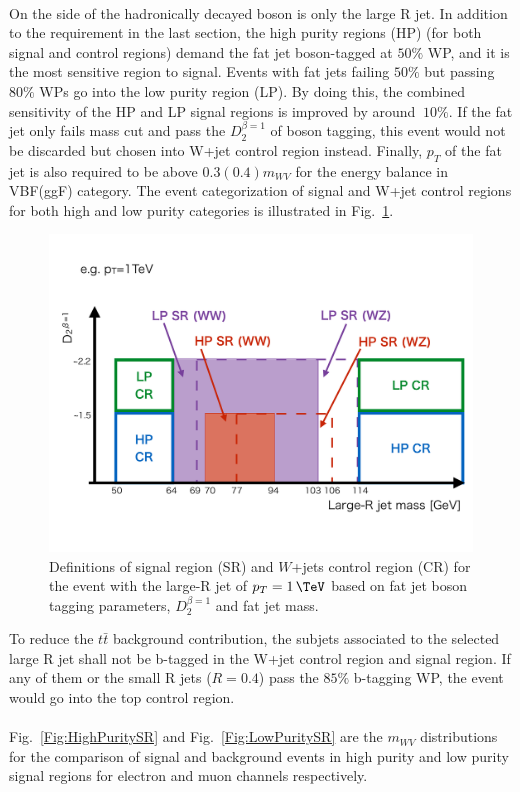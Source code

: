 \\On the side of the hadronically decayed boson is only the large R jet. In addition to the requirement in the last section, the high purity regions (HP) (for both signal and control regions) demand the fat jet boson-tagged at $50\%$ WP, and it is the most sensitive region to signal. Events with fat jets failing $50\%$ but passing $80\%$ WPs go into the low purity region (LP). By doing this, the combined sensitivity of the HP and LP signal regions is improved by around $~10\%$.\cite{EXOT-2016-28} If the fat jet only fails mass cut and pass the $D_{2}^{\beta=1}$ of boson tagging, this event would not be discarded but chosen into W+jet control region instead. Finally, $p_{T}$ of the fat jet is also required to be above $0.3(0.4)m_{WV}$ for the energy balance in VBF(ggF) category. The event categorization of signal and W+jet control regions for both high and low purity categories is illustrated in Fig.~\ref{Fig:HPLPdefinitions}.
\begin{figure}[h]
	\centering
	\includegraphics[width=0.8\hsize]{Chapter3/HPLPdefinitions}
	\caption{Definitions of signal region (SR) and $W$+jets control region (CR) for the event with the large-R jet of $\pt=1\,\TeV$ based on fat jet boson tagging parameters, $D_{2}^{\beta=1}$ and fat jet mass. }
	\label{Fig:HPLPdefinitions}
\end{figure}
\noindent
To reduce the $t\bar{t}$ background contribution, the subjets associated to the selected large R jet shall not be b-tagged in the W+jet control region and signal region. If any of them or the small R jets ($R=0.4$) pass the $85\%$ b-tagging WP, the event would go into the top control region. 
\\
\\Fig.~\ref{Fig:HighPuritySR} and Fig.~\ref{Fig:LowPuritySR} are the $m_{WV}$ distributions for the comparison of signal and background events in high purity and low purity signal regions for electron and muon channels respectively. 
